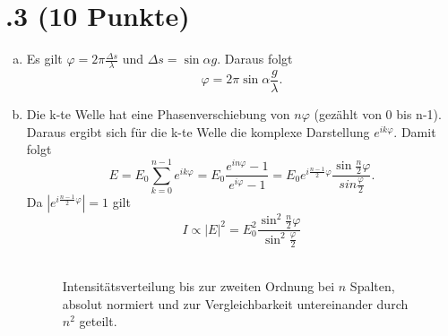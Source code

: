 \section*{\nr.3 \titthree (10 Punkte)}
\begin{enumerate}[(a)]
\item Es gilt $\varphi = 2\pi\frac{\Delta s}{\lambda}$ und $\Delta s = \sin{\alpha }g$. Daraus folgt
\begin{equation}
	\varphi = 2\pi\sin{\alpha}\frac{g}{\lambda}.
\end{equation}
\item Die k-te Welle hat eine Phasenverschiebung von $n\varphi$ (gezählt von 0 bis n-1). Daraus ergibt sich für die k-te Welle die komplexe Darstellung $e^{ik\varphi}$. Damit folgt
\begin{equation}
	E = E_0 \sum_{k=0}^{n-1} e^{ik\varphi} = E_0 \frac{e^{in\varphi} - 1}{e^{i\varphi}  - 1} = E_0 e^{i\frac{n-1}{2}\varphi}\frac{\sin{\frac{n}{2}\varphi}}{sin{\frac{\varphi}{2}}}.
\end{equation}
Da $|e^{i\frac{n-1}{2}\varphi}| = 1$ gilt
\begin{equation}
	I \propto |E|^2 = E_0^2 \frac{\sin^2{\frac{n}{2}\varphi}}{\sin^2{\frac{\varphi}{2}}}
\end{equation} \\

\begin{figure}[htbp]
\centering

\caption{Intensitätsverteilung bis zur zweiten Ordnung bei $n$ Spalten, absolut normiert und zur Vergleichbarkeit untereinander durch $n^2$ geteilt.}
\label{fig:beugung}
\end{figure}
\end{enumerate}
